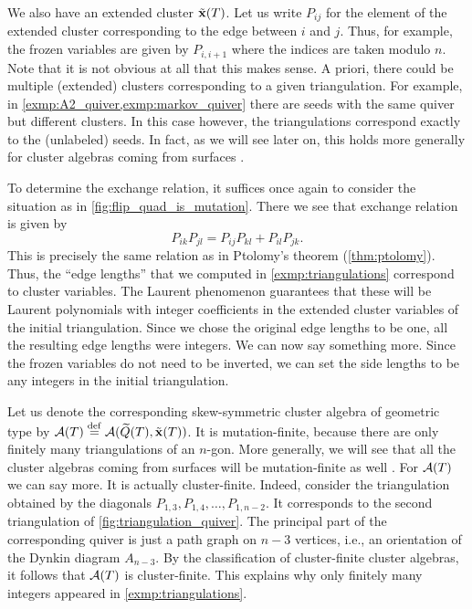 \begin{example}
	We also have an extended cluster $\tilde{\mathbf{x}}(T)$. Let us write $P_{ij}$ for the element of
	the extended cluster corresponding to the edge between $i$ and $j$. Thus, for example,
	the frozen variables are given by $P_{i, i+1}$ where the indices are taken modulo $n$.
	Note that it is not obvious at all that this makes sense. A priori, there could be
	multiple (extended) clusters corresponding to a given triangulation. For example, in
	\cref{exmp:A2_quiver,exmp:markov_quiver} there are seeds with the same quiver but
	different clusters. In this case however, the triangulations correspond exactly to the
	(unlabeled) seeds. In fact, as we will see later on, this holds more generally for
	cluster algebras coming from surfaces \parencite[Theorem 6.1]{FominThurston2018CATriangulatedSurfacesII}.

	To determine the exchange relation, it suffices once again to consider the situation as
	in \cref{fig:flip_quad_is_mutation}. There we see that exchange relation is given by
	\begin{equation}\label{eq:exchange_flip_quad}
		P_{ik}P_{jl} = P_{ij}P_{kl} + P_{il}P_{jk}.
	\end{equation}
	This is precisely the same relation as in Ptolomy's theorem (\cref{thm:ptolomy}). Thus,
	the ``edge lengths'' that we computed in \cref{exmp:triangulations} correspond to
	cluster variables. The Laurent phenomenon guarantees that these will be Laurent
	polynomials with integer coefficients in the extended cluster variables of the initial
	triangulation. Since we chose the original edge lengths to be one, all the resulting
	edge lengths were integers. We can now say something more. Since the frozen variables
	do not need to be inverted, we can set the side lengths to be any integers in the
	initial triangulation.

	Let us denote the corresponding skew-symmetric cluster algebra of geometric type by
	$\mathcal{A}(T) \overset{\mathrm{def}}{=} \mathcal{A}(\widetilde{Q}(T), \tilde{\mathbf{x}}(T))$. It is mutation-finite, because there are only
	finitely many triangulations of an $n$-gon. More generally, we will see that all the
	cluster algebras coming from surfaces will be mutation-finite as well \parencite[Corollary 12.2]{FominShapiroThurston2008CATriangulatedSurfacesI}. For $\mathcal{A}(T)$
	we can say more. It is actually cluster-finite. Indeed, consider the triangulation
	obtained by the diagonals $P_{1, 3}, P_{1,4}, \dots, P_{1,n-2}$. It corresponds to the
	second triangulation of \cref{fig:triangulation_quiver}. The principal part of the
	corresponding quiver is just a path graph on $n-3$ vertices, i.e., an orientation of
	the Dynkin diagram $A_{n-3}$. By the classification of cluster-finite cluster algebras,
	it follows that $\mathcal{A}(T)$ is cluster-finite. This explains why only finitely many
	integers appeared in \cref{exmp:triangulations}.


\end{example}
